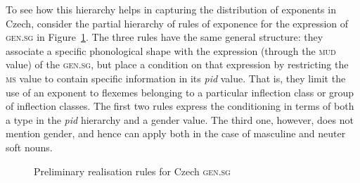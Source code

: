 \documentclass[output=paper]{langsci/langscibook}
\begin{document}
\newpage
To see how this hierarchy helps in capturing the distribution of
exponents in Czech, consider the partial hierarchy of rules of exponence for the
expression of \textsc{gen.sg} in Figure~\ref{fig:BonamiCrysmann:cz:re}.  The three
rules have the same general structure: they associate a specific
phonological shape with the expression (through the \textsc{mud}
value) of the \textsc{gen.sg}, but place a condition on that
expression by restricting the \textsc{ms} value to contain specific
information in its \textit{pid} value. That is, they limit the use of
an exponent to flexemes belonging to a particular inflection class or
group of inflection classes. The first two rules express the
conditioning in terms of both a type in the \textit{pid} hierarchy
 and a gender value.  The third one, however, does not mention
gender, and hence can apply both in the case of masculine and neuter
soft nouns.


\begin{figure}[t]
\centering\smaller
{}
\begin{avmtree}
\itshape
{}
\end{avmtree}
\caption{Preliminary realisation rules for Czech \textsc{gen.sg}\label{fig:BonamiCrysmann:cz:re}}
\end{figure}
\end{document}
